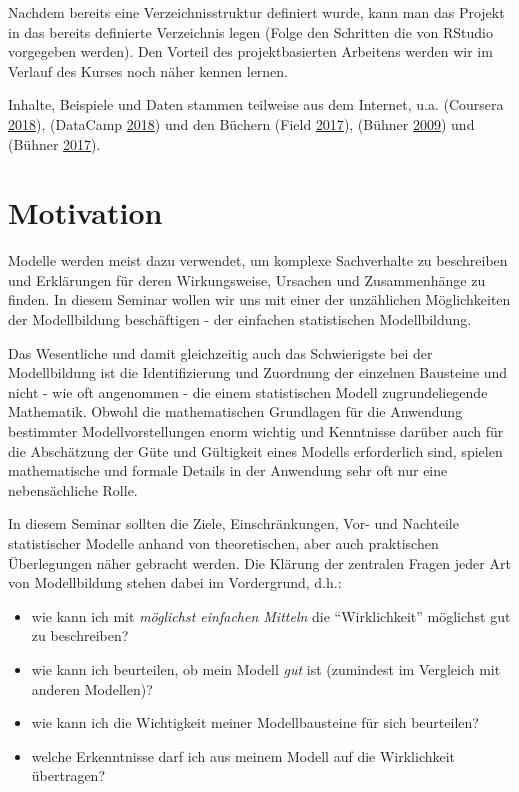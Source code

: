 \documentclass[]{article}
\providecommand{\tightlist}{%
  \setlength{\itemsep}{0pt}\setlength{\parskip}{0pt}}
\begin{document}
Nachdem bereits eine Verzeichnisstruktur definiert wurde, kann man das Projekt in das bereits definierte Verzeichnis legen (Folge den Schritten die von RStudio vorgegeben werden). Den Vorteil des projektbasierten Arbeitens werden wir im Verlauf des Kurses noch näher kennen lernen.

Inhalte, Beispiele und Daten stammen teilweise aus dem Internet, u.a. (Coursera \protect\hyperlink{ref-Coursera.2018}{2018}), (DataCamp \protect\hyperlink{ref-DataCamp.2018}{2018}) und den Büchern (Field \protect\hyperlink{ref-Field.2017}{2017}), (Bühner \protect\hyperlink{ref-Buhner.2009}{2009}) und (Bühner \protect\hyperlink{ref-Buhner.2017}{2017}).

\hypertarget{motivation}{%
\section*{Motivation}\label{motivation}}

Modelle werden meist dazu verwendet, um komplexe Sachverhalte zu beschreiben und Erklärungen für deren Wirkungsweise, Ursachen und Zusammenhänge zu finden. In diesem Seminar wollen wir uns mit einer der unzählichen Möglichkeiten der Modellbildung beschäftigen - der einfachen statistischen Modellbildung.

Das Wesentliche und damit gleichzeitig auch das Schwierigste bei der Modellbildung ist die Identifizierung und Zuordnung der einzelnen Bausteine und nicht - wie oft angenommen - die einem statistischen Modell zugrundeliegende Mathematik. Obwohl die mathematischen Grundlagen für die Anwendung bestimmter Modellvorstellungen enorm wichtig und Kenntnisse darüber auch für die Abschätzung der Güte und Gültigkeit eines Modells erforderlich sind, spielen mathematische und formale Details in der Anwendung sehr oft nur eine nebensächliche Rolle.

In diesem Seminar sollten die Ziele, Einschränkungen, Vor- und Nachteile statistischer Modelle anhand von theoretischen, aber auch praktischen Überlegungen näher gebracht werden. Die Klärung der zentralen Fragen jeder Art von Modellbildung stehen dabei im Vordergrund, d.h.:

\begin{itemize}
\tightlist
\item
  wie kann ich mit \emph{möglichst einfachen Mitteln} die ``Wirklichkeit'' möglichst gut zu beschreiben?
\item
  wie kann ich beurteilen, ob mein Modell \emph{gut} ist (zumindest im Vergleich mit anderen Modellen)?
\item
  wie kann ich die Wichtigkeit meiner Modellbausteine für sich beurteilen?
\item
  welche Erkenntnisse darf ich aus meinem Modell auf die Wirklichkeit übertragen?
\end{itemize}
\end{document}
